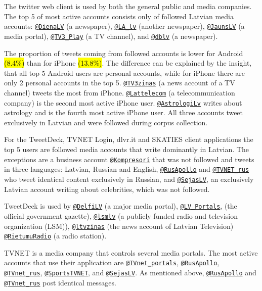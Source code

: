 \documentclass{IOS-Book-Article}
\makeatletter
\newcommand{\sn}[1]{\href{https://twitter.com/#1}{\texttt{@#1}}}
\makeatother
\begin{document}
The twitter web client is used by both the general public and media companies. The top 5 of most active accounts consists only of followed Latvian media accounts: \sn{DienaLV} (a newspaper), \sn{LA\_lv} (another newspaper), \sn{JaunsLV} (a media portal), \sn{TV3\_Play} (a TV channel), and \sn{dblv} (a newspaper).

The proportion of tweets coming from followed accounts is lower for Android \hl{(8.4\%)} than for iPhone \hl{(13.8\%)}. The difference can be explained by the insight, that all top 5 Android users are personal accounts, while for iPhone there are only 2 personal accounts in the top 5. \sn{TV3zinas} (a news account of a TV channel) tweets the most from iPhone. \sn{Lattelecom} (a telecommunication company) is the second most active iPhone user. \sn{AstrologiLv} writes about astrology and is the fourth most active iPhone user. All three accounts tweet exclusively in Latvian and were followed during corpus collection.

For the TweetDeck, TVNET Login, dlvr.it and SKATIES client applications the top 5 users are followed media accounts that write dominantly in Latvian. The exceptions are a business account \sn{Kompresori} that was not followed and tweets in three languages: Latvian, Russian and English, \sn{RusApollo} and \sn{TVNET\_rus} who tweet identical content exclusively in Russian, and \sn{SejasLV}, an exclusively Latvian account writing about celebrities, which was not followed.


TweetDeck is used by \sn{DelfiLV} (a major media portal), \sn{LV\_Portals}, (the official government gazette), \sn{lsmlv} (a publicly funded radio and television organization (LSM)), \sn{ltvzinas} (the news account of Latvian Television) \sn{RietumuRadio} (a radio station). 

TVNET is a media company that controls several media portals. The most active accounts that use their application are \sn{TVnet\_portals}, \sn{RusApollo}, \sn{TVnet\_rus}, \sn{SportsTVNET}, and \sn{SejasLV}. As mentioned above, \sn{RusApollo} and \sn{TVnet\_rus} post identical messages.
\end{document}
